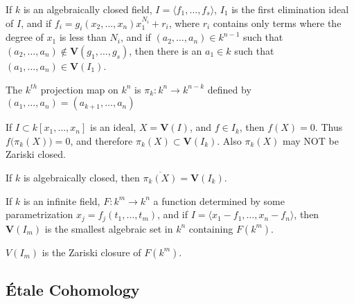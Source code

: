 \documentclass[crop=false,class=book,oneside]{standalone}
\begin{document}
            \begin{theorem}
                If $k$ is an algebraically closed field,
                $I=\langle{f_{1}},\hdots,f_{s}\rangle$, $I_{1}$ is
                the first elimination ideal of $I$, and if
                $f_{i}=g_{i}(x_{2},\hdots,x_{n})x_{1}^{N_i}+r_{i}$,
                where $r_{i}$ contains only terms where the degree
                of $x_{1}$ is less than $N_{i}$, and if
                $(a_{2},\hdots,a_{n})\in{k}^{n-1}$ such that
                $(a_{2},\hdots,a_{n})\notin%
                 \mathbf{V}(g_{1},\hdots,g_{s})$,
                 then there is an $a_1 \in k$ such that
                 $(a_{1},\hdots,a_{n})\in\mathbf{V}(I_1)$.
            \end{theorem}
            \begin{definition}
                The $k^{th}$ projection map on $k^{n}$ is
                $\pi_{k}:k^{n}\rightarrow k^{n-k}$ defined by
                $(a_{1},\hdots,a_{n})=(a_{k+1},\hdots,a_{n})$
            \end{definition}
            \begin{remark}
                If $I\subset{k}[x_{1},\hdots,x_{n}]$ is an ideal,
                $X=\mathbf{V}(I)$, and $f\in{I_{k}}$,
                then $f(X)=0$.
                Thus $f\big(\pi_{k}(X)\big)=0$, and therefore
                $\pi_{k}(X)\subset\mathbf{V}(I_k)$.
                Also $\pi_{k}(X)$ may NOT be Zariski closed.
            \end{remark}
            \begin{theorem}
                If $k$ is algebraically closed,
                then $\overline{\pi_k(X)}=\mathbf{V}(I_k)$.
            \end{theorem}
            \begin{theorem}
                If $k$ is an infinite field,
                $F:k^{m}\rightarrow{k^{n}}$ a function determined
                by some parametrization
                $x_{j}=f_{j}(t_{1},\hdots,t_{m})$, and if
                $I=\langle{x_{1}-f_{1}},\hdots,x_{n}-f_{n}\rangle$,
                then $\mathbf{V}(I_m)$ is the smallest algebraic
                set in $k^{n}$ containing $F(k^{m})$.
            \end{theorem}
            \begin{remark}
                $V(I_{m})$ is the Zariski closure of $F(k^{m})$.
            \end{remark}
        \subsection{\'{E}tale Cohomology}
\end{document}
